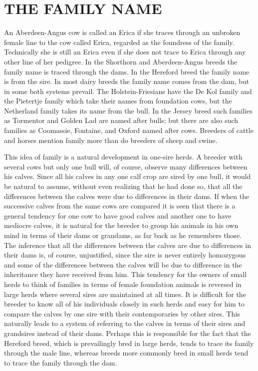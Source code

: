 \section*{THE FAMILY NAME}

An Aberdeen-Angus cow is called an Erica if she traces through an
unbroken female line to the cow called Erica, regarded as the foundress
of the family. Technically she is still an Erica even if she does not trace
to Erica through any other line of her pedigree. In the Shorthorn and
Aberdeen-Angus breeds the family name is traced through the dams.
In the Hereford breed the family name is from the sire. In most dairy
breeds the family name comes from the dam, but in some both systems
prevail. The Holstein-Friesians have the De Kol family and the Pietertje
family which take their names from foundation cows, but the
Netherland family takes its name from the bull. In the Jersey breed
such families as Tormentor and Golden Lad are named after bulls; but
there are also such families as Coomassie, Fontaine, and Oxford named
after cows. Breeders of cattle and horses mention family more than do
breeders of sheep and swine.

This idea of family is a natural development in one-sire herds. A
breeder with several cows but only one bull will, of course, observe
many differences between his calves. Since all his calves in any one calf
crop are sired by one bull, it would be natural to assume, without even
realizing that he had done so, that all the differences between the calves
were due to differences in their dams. If when the successive calves from
the same cows are compared it is seen that there is a general tendency
for one cow to have good calves and another one to have mediocre
calves, it is natural for the breeder to group his animals in his own mind
in terms of their dams or grandams, as far back as he remembers those.
The inference that all the differences between the calves are due to differences
in their dams is, of course, unjustified, since the sire is never
entirely homozygous and some of the differences between the calves
will be due to difference in the inheritance they have received from him.
This tendency for the owners of small herds to think of families in
terms of female foundation animals is reversed in large herds where
several sires are maintained at all times. It is difficult for the breeder to
know all of his individuals closely in such herds and easy for him to
compare the calves by one sire with their contemporaries by other sires.
This naturally leads to a system of referring to the calves in terms of
their sires and grandsires instead of their dams. Perhaps this is responsible
for the fact that the Hereford breed, which is prevailingly bred in
large herds, tends to trace its family through the male line, whereas
breeds more commonly bred in small herds tend to trace the family
through the dam.

